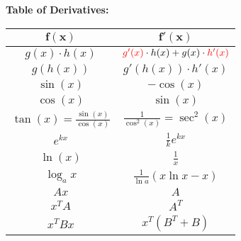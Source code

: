 \begin{tcolorbox}[colback=blue!5!white,colframe=blue!75!black,title=\textbf{Introduction}]
\textbf{Table of Derivatives:}
\begin{center}
\begin{tabular}{|c|c|}
	\hline 
	\textbf{$\mathbf{f(x)}$} & \textbf{$\mathbf{f'(x)}$} \\ 
	\hline 
	$ g(x) \cdot h(x)$& ${\color{red}g'(x)} \cdot h(x) + g(x) \cdot {\color{red}h'(x)}$ \\ 
	\hline 
	$ g(h(x))$ & $g'(h(x)) \cdot h'(x)$ \\ 
	\hline 
	$\sin(x)$ & $-\cos(x)$ \\ 
	\hline 
	$\cos(x)$ & $\sin(x)$ \\ 
	\hline 
	$\tan(x) = \frac{\sin(x)}{\cos(x)}$& $ \frac{1}{\cos^2(x)} = \sec^2(x)$ \\ 
	\hline 
	$e^{kx}$& $\frac{1}{k}e^{kx} $\\ 
	\hline 
	$\ln(x)$& $\frac{1}{x}$ \\ 
	\hline 
	$\log_ax$& $\frac{1}{\ln a}(x\ln x -x)$ \\ 
	\hline $Ax$ & $A$ \\
	\hline
	$x^T A$ & $A^T$ \\
	\hline
	$x^T B x $ & $x^T(B^T + B)$\\
	\hline
\end{tabular} 
\end{center}
\end{tcolorbox}